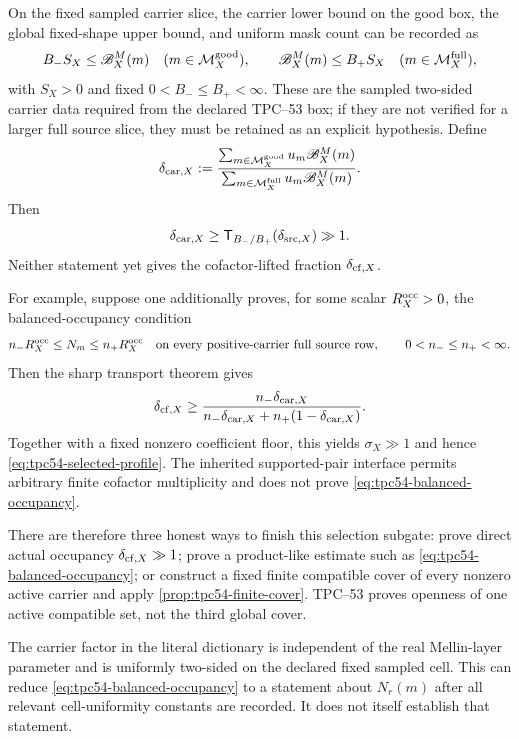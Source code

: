 On the fixed sampled carrier slice, the carrier lower bound on the good
box, the global fixed-shape upper bound, and uniform mask count can be
recorded as
\begin{equation}
 B_-S_X\le\mathscr B_X^M(m)\quad(m\in\mathcal M_X^{\rm good}),
 \qquad
 \mathscr B_X^M(m)\le B_+S_X\quad(m\in\mathcal M_X^{\rm full}),
 \label{eq:tpc54-carrier-two-sided}
\end{equation}
with \(S_X>0\) and fixed \(0<B_-\le B_+<\infty\).  These are the sampled
two-sided carrier data required from the declared TPC--53 box; if they are
not verified for a larger full source slice, they must be retained as an
explicit hypothesis.  Define
\begin{equation}
 \delta_{{\rm car},X}
 :=\frac{\sum_{m\in\mathcal M_X^{\rm good}}
 u_m\mathscr B_X^M(m)}
 {\sum_{m\in\mathcal M_X^{\rm full}}u_m\mathscr B_X^M(m)}.
 \label{eq:tpc54-carrier-fraction}
\end{equation}
Then
\begin{equation}
 \delta_{{\rm car},X}
 \ge\mathsf T_{B_-/B_+}(\delta_{{\rm src},X})\gg1.
 \label{eq:tpc54-carrier-transport}
\end{equation}
Neither statement yet gives the cofactor-lifted fraction
\(\delta_{{\rm cf},X}\).

For example, suppose one additionally proves, for some scalar
\(R_X^{\rm occ}>0\), the balanced-occupancy condition
\begin{equation}
 n_-R_X^{\rm occ}\le N_m\le n_+R_X^{\rm occ}
 \quad\text{on every positive-carrier full source row},
 \qquad 0<n_-\le n_+<\infty.
 \label{eq:tpc54-balanced-occupancy}
\end{equation}
Then the sharp transport theorem gives
\begin{equation}
 \delta_{{\rm cf},X}
 \ge
 \frac{n_-\delta_{{\rm car},X}}
 {n_-\delta_{{\rm car},X}+n_+(1-\delta_{{\rm car},X})}.
 \label{eq:tpc54-physical-occupancy}
\end{equation}
Together with a fixed nonzero coefficient floor, this yields
\(\sigma_X\gg1\) and hence \eqref{eq:tpc54-selected-profile}.  The
inherited supported-pair interface permits arbitrary finite cofactor
multiplicity and does not prove \eqref{eq:tpc54-balanced-occupancy}.

There are therefore three honest ways to finish this selection subgate:
prove direct actual occupancy \(\delta_{{\rm cf},X}\gg1\); prove a
product-like estimate such as \eqref{eq:tpc54-balanced-occupancy}; or
construct a fixed finite compatible cover of every nonzero active carrier
and apply \cref{prop:tpc54-finite-cover}.  TPC--53 proves openness of one
active compatible set, not the third global cover.

\begin{remark}
The carrier factor in the literal dictionary is independent of the real
Mellin-layer parameter and is uniformly two-sided on the declared fixed
sampled cell.  This can reduce \eqref{eq:tpc54-balanced-occupancy} to a statement
about \(N_r(m)\) after all relevant cell-uniformity constants are recorded.
It does not itself establish that statement.
\end{remark}
